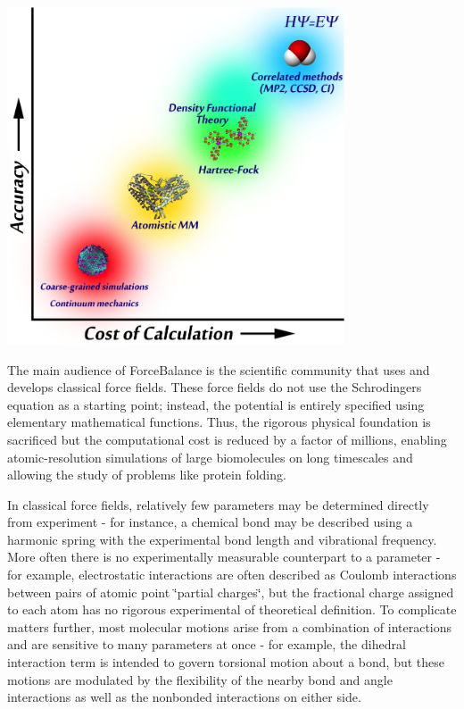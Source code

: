 
\begin{DoxyImage}
\includegraphics[width=10cm]{ladder.png}
\end{DoxyImage}


The main audience of Force\+Balance is the scientific community that uses and develops classical force fields. These force fields do not use the Schrodinger\textquotesingle{}s equation as a starting point; instead, the potential is entirely specified using elementary mathematical functions. Thus, the rigorous physical foundation is sacrificed but the computational cost is reduced by a factor of millions, enabling atomic-\/resolution simulations of large biomolecules on long timescales and allowing the study of problems like protein folding.

In classical force fields, relatively few parameters may be determined directly from experiment -\/ for instance, a chemical bond may be described using a harmonic spring with the experimental bond length and vibrational frequency. More often there is no experimentally measurable counterpart to a parameter -\/ for example, electrostatic interactions are often described as Coulomb interactions between pairs of atomic point \char`\"{}partial charges\char`\"{}, but the fractional charge assigned to each atom has no rigorous experimental of theoretical definition. To complicate matters further, most molecular motions arise from a combination of interactions and are sensitive to many parameters at once -\/ for example, the dihedral interaction term is intended to govern torsional motion about a bond, but these motions are modulated by the flexibility of the nearby bond and angle interactions as well as the nonbonded interactions on either side.


